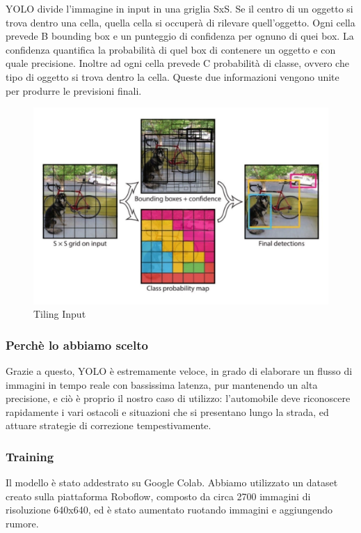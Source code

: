 \documentclass{article}
\begin{document}
\newpage
YOLO divide l'immagine in input in una griglia SxS. Se il centro di un oggetto si trova dentro una cella, quella cella si occuperà di rilevare quell'oggetto.
Ogni cella prevede B bounding box e un punteggio di confidenza per ognuno di quei box. La confidenza quantifica la probabilità di quel box di contenere un oggetto e con quale precisione. Inoltre ad ogni cella prevede C probabilità di classe, ovvero che tipo di oggetto si trova dentro la cella. 
Queste due informazioni vengono unite per produrre le previsioni finali.

\begin{figure}[h!]
    \centering
    \includegraphics[width=0.8\linewidth]{img/cf.jpg}
    \caption{Tiling Input}
\end{figure}

\subsubsection{Perchè lo abbiamo scelto}
Grazie a questo, YOLO è estremamente veloce, in grado di elaborare un flusso di immagini in tempo reale con bassissima latenza, pur mantenendo un alta precisione, e ciò è proprio il nostro caso di utilizzo: l'automobile deve riconoscere rapidamente i vari ostacoli e situazioni che si presentano lungo la strada, ed attuare strategie di correzione tempestivamente.

\subsubsection{Training}

  Il modello è stato addestrato su Google Colab.
  Abbiamo utilizzato un dataset creato sulla piattaforma Roboflow, composto da circa 2700 immagini di risoluzione 640x640, ed è stato aumentato ruotando immagini e aggiungendo rumore.
  
\end{document}
